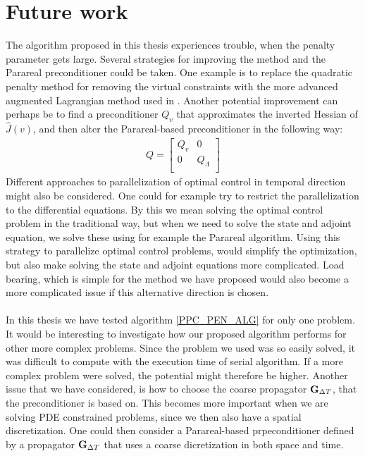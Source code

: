 \section{Future work}
The algorithm proposed in this thesis experiences trouble, when the penalty parameter gets large. Several strategies for improving the method and the Parareal preconditioner could be taken. One example is to replace the quadratic penalty method for removing the virtual constraints with the more advanced augmented Lagrangian method used in \cite{rao2016time}. Another potential improvement can perhaps be to find a preconditioner $Q_v$ that approximates the inverted Hessian of $\hat J(v)$, and then alter the Parareal-based preconditioner in the following way:
\begin{align*}
Q = \left[ \begin{array}{cc}
	Q_v & 0 \\
	0 & Q_{\Lambda} \\
	\end{array} \right]
\end{align*}
Different approaches to parallelization of optimal control in temporal direction might also be considered. One could for example try to restrict the parallelization to the differential equations. By this we mean solving the optimal control problem in the traditional way, but when we need to solve the state and adjoint equation, we solve these using for example the Parareal algorithm. Using this strategy to parallelize optimal control problems, would simplify the optimization, but also make solving the state and adjoint equations more complicated. Load bearing, which is simple for the method we have proposed would also become a more complicated issue if this alternative direction is chosen.
\\
\\
In this thesis we have tested algorithm \ref{PPC_PEN_ALG} for only one problem. It would be interesting to investigate how our proposed algorithm performs for other more complex problems. Since the problem we used was so easily solved, it was difficult to compute with the execution time of serial algorithm. If a more complex problem were solved, the potential might therefore be higher. Another issue that we have considered, is how to choose the coarse propagator $\bold G_{\Delta T}$, that the preconditioner is based on. This becomes more important when we are solving PDE constrained problems, since we then also have a spatial discretization. One could then consider a Parareal-based prpeconditioner defined by a propagator $\bold G_{\Delta T}$  that uses a coarse dicretization in both space and time.



